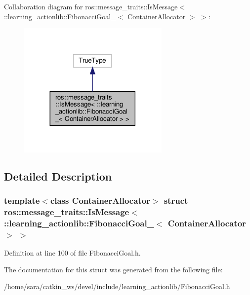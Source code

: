 Collaboration diagram for ros\+:\+:message\+\_\+traits\+:\+:Is\+Message$<$ \+:\+:learning\+\_\+actionlib\+:\+:Fibonacci\+Goal\+\_\+$<$ Container\+Allocator $>$ $>$\+:
\nopagebreak
\begin{figure}[H]
\begin{center}
\leavevmode
\includegraphics[width=209pt]{structros_1_1message__traits_1_1IsMessage_3_01_1_1learning__actionlib_1_1FibonacciGoal___3_01Con237bd328002a4a2659f83465f6e37efa}
\end{center}
\end{figure}


\subsection{Detailed Description}
\subsubsection*{template$<$class Container\+Allocator$>$\newline
struct ros\+::message\+\_\+traits\+::\+Is\+Message$<$ \+::learning\+\_\+actionlib\+::\+Fibonacci\+Goal\+\_\+$<$ Container\+Allocator $>$ $>$}



Definition at line 100 of file Fibonacci\+Goal.\+h.



The documentation for this struct was generated from the following file\+:\begin{DoxyCompactItemize}
\item 
/home/sara/catkin\+\_\+ws/devel/include/learning\+\_\+actionlib/Fibonacci\+Goal.\+h\end{DoxyCompactItemize}
